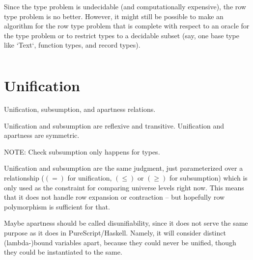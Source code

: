 \documentclass[11pt, twoside, reqno]{book}
\begin{document}
%
%
%
%

Since the type problem is undecidable (and computationally expensive), the row type problem is no better.
However, it might still be possible to make an algorithm for the row type problem that is complete with respect to an oracle for the type problem or to restrict types to a decidable subset (say, one base type like \inHS`Text`, function types, and record types).

\begin{displaymath}
\end{displaymath}






\chapter{Unification}
Unification, subsumption, and apartness relations.

Unification and subsumption are reflexive and transitive.
Unification and apartness are symmetric.

NOTE: Check subsumption only happens for types.

Unification and subsumption are the same judgment, just parameterized over a relationship ($(=)$ for unification, \((\le)\) or \((\ge)\) for subsumption) which is only used as the constraint for comparing universe levels right now.
This means that it does not handle row expansion or contraction -- but hopefully row polymorphism is sufficient for that.

Maybe apartness should be called disunifiability, since it does not serve the same purpose as it does in PureScript/Haskell.
Namely, it will consider distinct (lambda-)bound variables apart, because they could never be unified, though they could be instantiated to the same.
\end{document}
